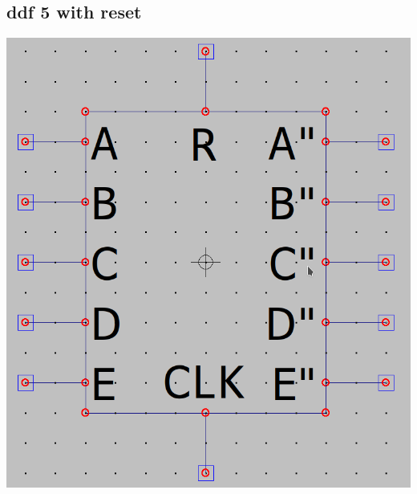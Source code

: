 \documentclass{homeworg}
\begin{document}
\newpage
\subsection{ddf 5 with reset}
    \begin{center}
        \includegraphics[scale=0.5]{dff5_reset_asy.png}

\end{center}
\end{document}
